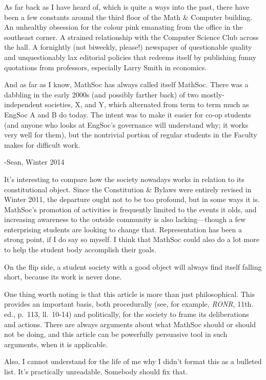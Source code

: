 
As far back as I have heard of, which is quite a ways into the past, there have
been a few constants around the third floor of the Math \& Computer building.
An unhealthy obsession for the colour pink emanating from the office in the
southeast corner. A strained relationship with the Computer Science Club across
the hall. A fornightly (not biweekly, please!) newspaper of questionable quality
and unquestionably lax editorial policies that redeems itself by publishing
funny quotations from professors, especially Larry Smith in economics.

And as far as I know, MathSoc has always called itself MathSoc. There was a
dabbling in the early 2000s (and possibly farther back) of two
mostly-independent societies, X, and Y, which alternated from term to term much
as EngSoc A and B do today. The intent was to make it easier for co-op students
(and anyone who looks at EngSoc's governance will understand why; it works very
well for them), but the nontrivial portion of regular students in the Faculty
makes for difficult work.

-Sean, Winter 2014


It's interesting to compare how the society nowadays works in relation to its
constitutional object. Since the Constitution \& Bylaws were entirely revised in
Winter 2011, the departure ought not to be too profound, but in some ways it is.
MathSoc's promotion of activities is frequently limited to the events it olds,
and increasing awareness to the outside community is also lacking---though a few
enterprising students are looking to change that. Representation has been a
strong point, if I do say so myself. I think that MathSoc could also do a lot
more to help the student body accomplish their goals.

On the flip side, a student society with a good object will always find itself
falling short, because its work is never done.

One thing worth noting is that this article is more than just philosophical.
This provides an important basis, both procedurally (see, for example,
\emph{RONR}, 11th. ed., p.~113, ll.~10-14) and politically, for the society to
frame its deliberations and actions. There are always arguments about what
MathSoc should or should not be doing, and this article can be powerfully
persuasive tool in such arguments, when it is applicable.

Also, I cannot understand for the life of me why I didn't format this as a
bulleted list. It's practically unreadable. Somebody should fix that.

